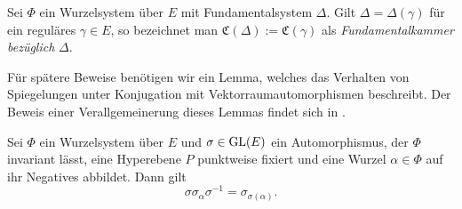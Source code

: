\begin{defn}
  Sei $\Phi$ ein Wurzelsystem über $E$ mit Fundamentalsystem $\Delta$.
  Gilt $\Delta = \Delta(\gamma)$ für ein reguläres $\gamma \in E$, so bezeichnet man $\mathfrak{C}(\Delta) := \mathfrak{C}(\gamma)$ als \emph{Fundamentalkammer bezüglich} $\Delta$.
\end{defn}

Für spätere Beweise benötigen wir ein Lemma, welches das Verhalten von Spiegelungen unter Konjugation mit Vektorraumautomorphismen beschreibt. 
Der Beweis einer Verallgemeinerung dieses Lemmas findet sich in \cite[S.43]{humphreys1972introduction}.

\begin{lem}
  \label{lem:conjReflection}
  Sei $\Phi$ ein Wurzelsystem über $E$ und $\sigma \in \operatorname{GL}(E)$ ein Automorphismus, der $\Phi$ invariant lässt, eine Hyperebene $P$ punktweise fixiert und eine Wurzel $\alpha \in \Phi$ auf ihr Negatives abbildet.
  Dann gilt 
  \begin{displaymath}
    \sigma \sigma_\alpha \sigma^{-1} = \sigma_{\sigma(\alpha)}.
  \end{displaymath}
\end{lem}


